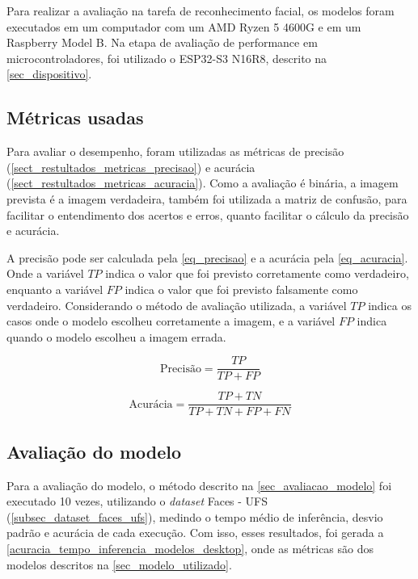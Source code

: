 Para realizar a avaliação na tarefa de reconhecimento facial, os modelos foram executados em um computador com um
AMD Ryzen 5 4600G e em um Raspberry Model B. Na etapa de avaliação de performance em microcontroladores, foi utilizado
o ESP32-S3 N16R8, descrito na \autoref{sec_dispositivo}.

\subsection{Métricas usadas}\label{sect_restultados_metricas}
Para avaliar o desempenho, foram utilizadas as métricas de precisão (\ref{sect_restultados_metricas_precisao})
e acurácia (\ref{sect_restultados_metricas_acuracia}). Como a avaliação é binária, a imagem prevista é a imagem
verdadeira, também foi utilizada a matriz de confusão, para facilitar o entendimento dos acertos e erros, quanto
facilitar o cálculo da precisão e acurácia.

\label{sect_restultados_metricas_precisao}
A precisão pode ser calculada pela \autoref{eq_precisao} e a acurácia pela \autoref{eq_acuracia}.
Onde a variável $TP$ indica o valor que foi previsto corretamente como verdadeiro, enquanto a variável $FP$ indica o
valor que foi previsto falsamente como verdadeiro.
Considerando o método de avaliação utilizada, a variável $TP$ indica os casos onde o modelo escolheu corretamente a
imagem, e a variável $FP$  indica quando o modelo escolheu a imagem errada.

\begin{equation}\label{eq_precisao}
	\text{Precisão} = \frac {TP} {TP + FP}
\end{equation}

\label{sect_restultados_metricas_acuracia}
\begin{equation}\label{eq_acuracia}
	\text{Acurácia} = \frac {TP + TN} {TP + TN + FP + FN}
\end{equation}

\subsection{Avaliação do modelo}
Para a avaliação do modelo, o método descrito na \autoref{sec_avaliacao_modelo} foi executado 10 vezes,
utilizando o \textit{dataset} Faces - UFS (\ref{subsec_dataset_faces_ufs}), medindo o tempo médio de inferência,
desvio padrão e acurácia de cada execução.
Com isso, esses resultados, foi gerada a \autoref{acuracia_tempo_inferencia_modelos_desktop}, onde as
métricas são dos modelos descritos na \autoref{sec_modelo_utilizado}.


